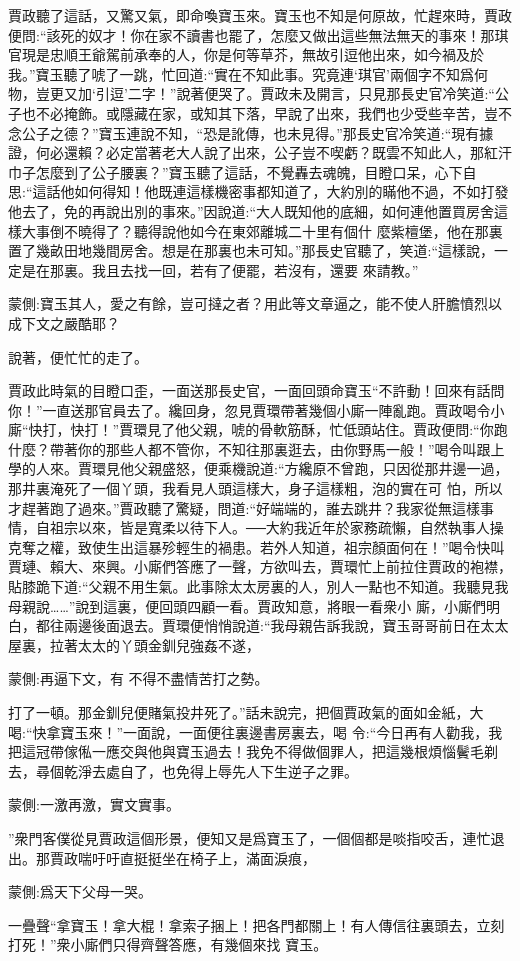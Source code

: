\begin{parag}
    賈政聽了這話，又驚又氣，即命喚寶玉來。寶玉也不知是何原故，忙趕來時，賈政便問:“該死的奴才！你在家不讀書也罷了，怎麼又做出這些無法無天的事來！那琪官現是忠順王爺駕前承奉的人，你是何等草芥，無故引逗他出來，如今禍及於我。”寶玉聽了唬了一跳，忙回道:“實在不知此事。究竟連‘琪官’兩個字不知爲何物，豈更又加‘引逗’二字！”說著便哭了。賈政未及開言，只見那長史官冷笑道:“公子也不必掩飾。或隱藏在家，或知其下落，早說了出來，我們也少受些辛苦，豈不念公子之德？”寶玉連說不知，“恐是訛傳，也未見得。”那長史官冷笑道:“現有據證，何必還賴？必定當著老大人說了出來，公子豈不喫虧？既雲不知此人，那紅汗巾子怎麼到了公子腰裏？”寶玉聽了這話，不覺轟去魂魄，目瞪口呆，心下自思:“這話他如何得知！他既連這樣機密事都知道了，大約別的瞞他不過，不如打發他去了，免的再說出別的事來。”因說道:“大人既知他的底細，如何連他置買房舍這樣大事倒不曉得了？聽得說他如今在東郊離城二十里有個什 麼紫檀堡，他在那裏置了幾畝田地幾間房舍。想是在那裏也未可知。”那長史官聽了，笑道:“這樣說，一定是在那裏。我且去找一回，若有了便罷，若沒有，還要 來請教。”\begin{note}蒙側:寶玉其人，愛之有餘，豈可撻之者？用此等文章逼之，能不使人肝膽憤烈以成下文之嚴酷耶？\end{note}說著，便忙忙的走了。
\end{parag}


\begin{parag}
    賈政此時氣的目瞪口歪，一面送那長史官，一面回頭命寶玉“不許動！回來有話問你！”一直送那官員去了。纔回身，忽見賈環帶著幾個小廝一陣亂跑。賈政喝令小廝“快打，快打！”賈環見了他父親，唬的骨軟筋酥，忙低頭站住。賈政便問:“你跑什麼？帶著你的那些人都不管你，不知往那裏逛去，由你野馬一般！”喝令叫跟上學的人來。賈環見他父親盛怒，便乘機說道:“方纔原不曾跑，只因從那井邊一過，那井裏淹死了一個丫頭，我看見人頭這樣大，身子這樣粗，泡的實在可 怕，所以才趕著跑了過來。”賈政聽了驚疑，問道:“好端端的，誰去跳井？我家從無這樣事情，自祖宗以來，皆是寬柔以待下人。──大約我近年於家務疏懶，自然執事人操克奪之權，致使生出這暴殄輕生的禍患。若外人知道，祖宗顏面何在！”喝令快叫賈璉、賴大、來興。小廝們答應了一聲，方欲叫去，賈環忙上前拉住賈政的袍襟，貼膝跪下道:“父親不用生氣。此事除太太房裏的人，別人一點也不知道。我聽見我母親說……”說到這裏，便回頭四顧一看。賈政知意，將眼一看衆小 廝，小廝們明白，都往兩邊後面退去。賈環便悄悄說道:“我母親告訴我說，寶玉哥哥前日在太太屋裏，拉著太太的丫頭金釧兒強姦不遂，\begin{note}蒙側:再逼下文，有 不得不盡情苦打之勢。\end{note}打了一頓。那金釧兒便賭氣投井死了。”話未說完，把個賈政氣的面如金紙，大喝:“快拿寶玉來！”一面說，一面便往裏邊書房裏去，喝 令:“今日再有人勸我，我把這冠帶傢俬一應交與他與寶玉過去！我免不得做個罪人，把這幾根煩惱鬢毛剃去，尋個乾淨去處自了，也免得上辱先人下生逆子之罪。\begin{note}蒙側:一激再激，實文實事。\end{note}”衆門客僕從見賈政這個形景，便知又是爲寶玉了，一個個都是啖指咬舌，連忙退出。那賈政喘吁吁直挺挺坐在椅子上，滿面淚痕，\begin{note}蒙側:爲天下父母一哭。\end{note}一疊聲“拿寶玉！拿大棍！拿索子捆上！把各門都關上！有人傳信往裏頭去，立刻打死！”衆小廝們只得齊聲答應，有幾個來找 寶玉。
\end{parag}


